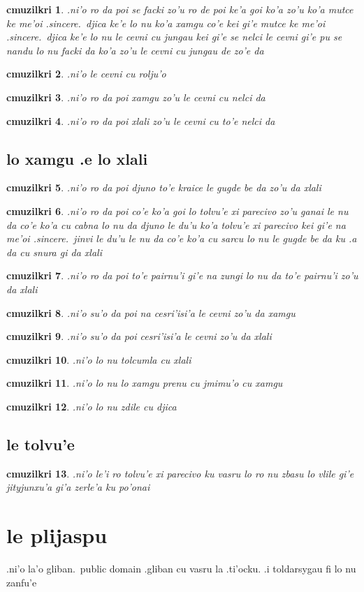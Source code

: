 \documentclass{report}
\newtheorem{cmuzilkri}{cmuzilkri}
\begin{document}
\begin{cmuzilkri}
        .ni'o ro da poi se facki zo'u ro de poi ke'a goi ko'a zo'u ko'a mutce ke me'oi .sincere.\ djica ke'e lo nu ko'a xamgu co'e kei gi'e mutce ke me'oi .sincere.\ djica ke'e lo nu le cevni cu jungau kei gi'e se nelci le cevni gi'e pu se nandu lo nu facki da ko'a zo'u le cevni cu jungau de zo'e da
\end{cmuzilkri}
\begin{cmuzilkri}
	.ni'o le cevni cu rolju'o
\end{cmuzilkri}
\begin{cmuzilkri}
        .ni'o ro da poi xamgu zo'u le cevni cu nelci da
\end{cmuzilkri}
\begin{cmuzilkri}
        .ni'o ro da poi xlali zo'u le cevni cu to'e nelci da
\end{cmuzilkri}

\section{lo xamgu .e lo xlali}
\begin{cmuzilkri}
	.ni'o ro da poi djuno to'e kraice le gugde be da zo'u da xlali
\end{cmuzilkri}
\begin{cmuzilkri}
        .ni'o ro da poi co'e ko'a goi lo tolvu'e xi parecivo zo'u ganai le nu da co'e ko'a cu cabna lo nu da djuno le du'u ko'a tolvu'e xi parecivo kei gi'e na me'oi .sincere.\ jinvi le du'u le nu da co'e ko'a cu sarcu lo nu le gugde be da ku .a da cu snura gi da xlali
\end{cmuzilkri}
\begin{cmuzilkri}
	.ni'o ro da poi to'e pairnu'i gi'e na zungi lo nu da to'e pairnu'i zo'u da xlali
\end{cmuzilkri}
\begin{cmuzilkri}
        .ni'o su'o da poi na cesri'isi'a le cevni zo'u da xamgu
\end{cmuzilkri}
\begin{cmuzilkri}
        .ni'o su'o da poi cesri'isi'a le cevni zo'u da xlali
\end{cmuzilkri}
\begin{cmuzilkri}
        .ni'o lo nu tolcumla cu xlali
\end{cmuzilkri}
\begin{cmuzilkri}
	.ni'o lo nu lo xamgu prenu cu jmimu'o cu xamgu
\end{cmuzilkri}
\begin{cmuzilkri}
        .ni'o lo nu zdile cu djica
\end{cmuzilkri}

\section{le tolvu'e}
\begin{cmuzilkri}
        .ni'o le'i ro tolvu'e xi parecivo ku vasru lo ro nu zbasu lo vlile gi'e jityjunxu'a gi'a zerle'a ku po'onai
\end{cmuzilkri}

\chapter{le plijaspu}
.ni'o la'o gliban.\ public domain .gliban cu vasru la .ti'ocku.  .i toldarsygau fi lo nu zanfu'e
\end{document}

